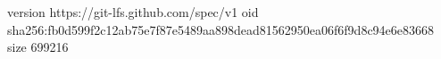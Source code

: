 version https://git-lfs.github.com/spec/v1
oid sha256:fb0d599f2c12ab75e7f87e5489aa898dead81562950ea06f6f9d8c94e6e83668
size 699216
